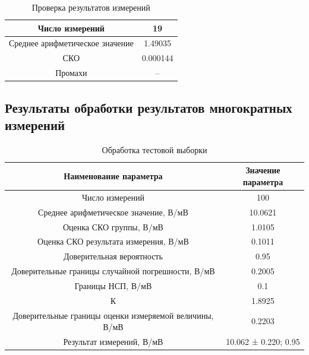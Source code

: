 \documentclass[a4paper,14pt]{article}
\begin{document}
\begin{table}[H]
	\centering
	\caption{Проверка результатов измерений }
	\label{tab:grubbs_train}
	\begin{tabular}{|c|c|}
		\hline
		Число измерений                 & 19       \\ \hline
		Среднее арифметическое значение & 1.49035  \\ \hline
		СКО                             & 0.000144 \\ \hline
		Промахи                         & --       \\ \hline
	\end{tabular}
\end{table}

\subsection{Результаты обработки результатов многократных измерений}

\begin{table}[H]
	\centering
	\caption{Обработка тестовой выборки }
	\label{tab:mm_test}
	\begin{tabular}{|c|c|}
		\hline
		Наименование параметра                                 & Значение параметра   \\ \hline
		Число измерений                                        & 100                  \\ \hline
		Среднее арифметическое значение, В/мВ                  & 10.0621              \\ \hline
		Оценка СКО группы, В/мВ                                & 1.0105               \\ \hline
		Оценка СКО результата измерения, В/мВ                  & 0.1011               \\ \hline
		Доверительная вероятность                              & 0.95                 \\ \hline
		Доверительные границы случайной погрешности, В/мВ      & 0.2005               \\ \hline
		Границы НСП, В/мВ                                      & 0.1                  \\ \hline
		К                                                      & 1.8925               \\ \hline
		Доверительные границы оценки измеряемой величины, В/мВ & 0.2203               \\ \hline
		Результат измерений, В/мВ                              & 10.062 ± 0.220; 0.95 \\ \hline
	\end{tabular}
\end{table}
\end{document}
